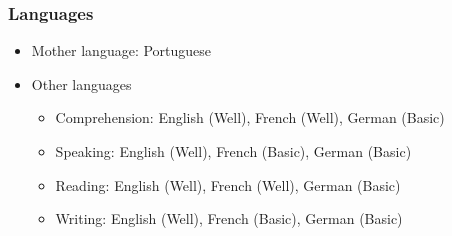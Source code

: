 \subsubsection{Languages}\label{languages}

\begin{itemize}
\item
  Mother language: Portuguese
\item
  Other languages

  \begin{itemize}
  \tightlist
  \item
    Comprehension: English (Well), French (Well), German (Basic)
  \item
    Speaking: English (Well), French (Basic), German (Basic)
  \item
    Reading: English (Well), French (Well), German (Basic)
  \item
    Writing: English (Well), French (Basic), German (Basic)
  \end{itemize}
\end{itemize}
